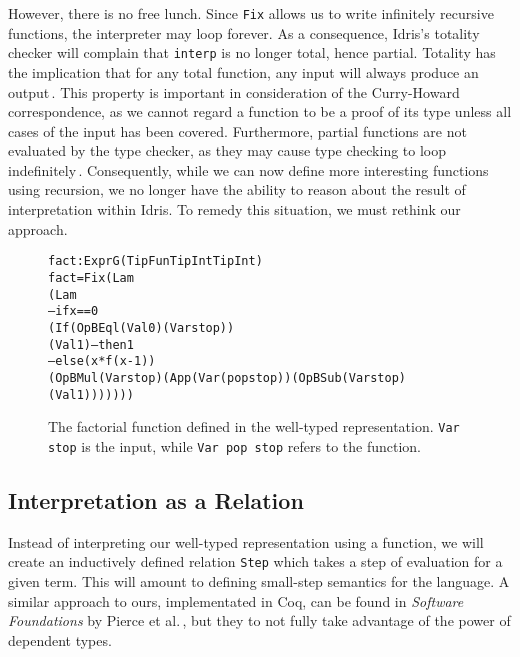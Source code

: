 However, there is no free lunch. Since \texttt{Fix} allows us to write infinitely recursive functions, the interpreter may loop forever. As a consequence, Idris's totality checker will complain that \texttt{interp} is no longer total, hence partial. Totality has the implication that for any total function, any input will always produce an output\,\cite{Turner04totalfunctional}. This property is important in consideration of the Curry-Howard correspondence, as we cannot regard a function to be a proof of its type unless all cases of the input has been covered. Furthermore, partial functions are not evaluated by the type checker, as they may cause type checking to loop indefinitely\,. Consequently, while we can now define more interesting functions using recursion, we no longer have the ability to reason about the result of interpretation within Idris. To remedy this situation, we must rethink our approach.
\begin{figure}
\begin{alltt}
fact : Expr G (TipFun TipInt TipInt)
fact = Fix (Lam 
             (Lam 
                -- if x == 0
                (If (OpB Eql (Val 0) (Var stop))
                  (Val 1) -- then 1
                  -- else (x * f (x - 1))
                  (OpB Mul (Var stop) (App (Var (pop stop)) (OpB Sub (Var stop) (Val 1))))))) 
\end{alltt}
\caption{The factorial function defined in the well-typed representation. \texttt{Var stop} is the input, while \texttt{Var pop stop} refers to the function.}
\end{figure}

\subsection{Interpretation as a Relation}
Instead of interpreting our well-typed representation using a function, we will create an inductively defined relation \texttt{Step} which takes a step of evaluation for a given term. This will amount to defining small-step semantics for the language. A similar approach to ours, implementated in Coq, can be found in \textit{Software Foundations} by Pierce et al.\,\cite{Pierce:SF}, but they to not fully take advantage of the power of dependent types.

